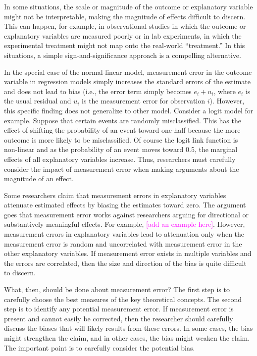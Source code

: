 \documentclass[12pt]{article}
\newcommand{\carlisle}[1]{\textcolor{magenta}{#1}}
\begin{document}
In some situations, the scale or magnitude of the outcome or explanatory variable might not be interpretable, making the magnitude of effects difficult to discern. This can happen, for example, in observational studies in which the outcome or explanatory variables are measured poorly or in lab experiments, in which the experimental treatment might not map onto the real-world ``treatment.'' In this situations, a simple sign-and-significance approach is a compelling alternative.


In the special case of the normal-linear model, measurement error in the outcome variable in regression models simply increases the standard errors of the estimate and does not lead to bias (i.e., the error term simply becomes $e_i + u_i$, where $e_i$ is the usual residual and $u_i$ is the measurement error for observation $i$). However, this specific finding does not generalize to other model. Consider a logit model for example. Suppose that certain events are randomly misclassified. This has the effect of shifting the probability of an event toward one-half because the more outcome is more likely to be misclassified. Of course the logit link function is non-linear and as the probability of an event moves toward 0.5, the marginal effects of all explanatory variables increase. Thus, researchers must carefully consider the impact of measurement error when making arguments about the magnitude of an effect.  


Some researchers claim that measurement errors in explanatory variables attenuate estimated effects by biasing the estimates toward zero. The argument goes that measurement error works against researchers arguing for directional or substantively meaningful effects. For example, \carlisle{[add an example here]}. However, measurement errors in explanatory variables lead to attenuation only when the measurement error is random and uncorrelated with measurement error in the other explanatory variables. If measurement error exists in multiple variables and the errors are correlated, then the size and direction of the bias is quite difficult to discern. 


What, then, should be done about measurement error? The first step is to carefully choose the best measures of the key theoretical concepts. The second step is to identify any potential measurement error. If measurement error is present and cannot easily be corrected, then the researcher should carefully discuss the biases that will likely results from these errors. In some cases, the bias might strengthen the claim, and in other cases, the bias might weaken the claim. The important point is to carefully consider the potential bias.
\end{document}
